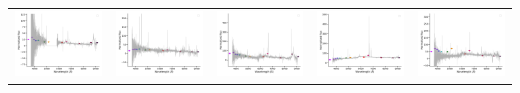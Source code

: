 \begin{center}
\begin{longtable}{l l l l l }
    \includegraphics[width=0.19\linewidth, clip]{Figs/Figs-lamost/spec-56218-EG213945N020821M01_sp05-072-STRIPE82-0122-053411.pdf} & \includegraphics[width=0.19\linewidth, clip]{Figs/Figs-lamost/spec-56285-HD122600N020231M01_sp08-053-SPLUS-n02n28-045059.pdf} & \includegraphics[width=0.19\linewidth, clip]{Figs/Figs-lamost/spec-56285-HD122600N020231M01_sp10-243-SPLUS-n02n26-033149.pdf} & \includegraphics[width=0.19\linewidth, clip]{Figs/Figs-lamost/spec-56591-EG012606S021203F01_sp09-053-STRIPE82-0033-008289.pdf} & \includegraphics[width=0.19\linewidth, clip]{Figs/Figs-lamost/spec-55893-F9304_sp15-076-STRIPE82-0057-019420.pdf} \\

\end{longtable}
\end{center}
